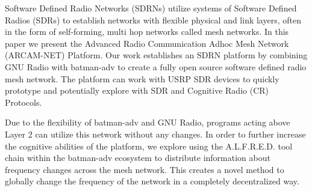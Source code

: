 
Software Defined Radio Networks (SDRNs) utilize systems of Software Defined Radios (SDRs) to establish networks with flexible physical and link layers, often in the form of self-forming, multi hop networks called mesh networks. In this paper we present the Advanced Radio Communication Adhoc Mesh Network (ARCAM-NET) Platform. Our work establishes an SDRN platform by combining GNU Radio with batman-adv to create a fully open source software defined radio mesh network. The platform can work with USRP SDR devices to quickly prototype and potentially explore with SDR and Cognitive Radio (CR) Protocols. 

Due to the flexibility of batman-adv and GNU Radio, programs acting above Layer 2 can utilize this network without any changes. In order to further increase the cognitive abilities of the platform, we explore using the A.L.F.R.E.D. tool chain within the batman-adv ecosystem to distribute information about frequency changes across the mesh network. This creates a novel method to globally change the frequency of the network in a completely decentralized way. 

